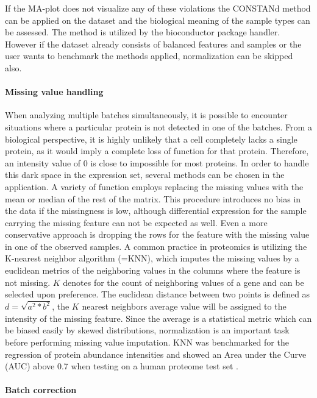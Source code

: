 \documentclass[
  11pt,
]{article}
\begin{document}
If the MA-plot does not visualize any of these violations the CONSTANd
method can be applied on the dataset and the biological meaning of the
sample types can be assessed. The method is utilized by the bioconductor
package handler. However if the dataset already consists of balanced
features and samples or the user wants to benchmark the methods applied,
normalization can be skipped also.

\hypertarget{missing-value-handling}{%
\paragraph{Missing value handling}\label{missing-value-handling}}

When analyzing multiple batches simultaneously, it is possible to
encounter situations where a particular protein is not detected in one
of the batches. From a biological perspective, it is highly unlikely
that a cell completely lacks a single protein, as it would imply a
complete loss of function for that protein. Therefore, an intensity
value of 0 is close to impossible for most proteins. In order to handle
this dark space in the expression set, several methods can be chosen in
the application. A variety of function employs replacing the missing
values with the mean or median of the rest of the matrix. This procedure
introduces no bias in the data if the missingness is low, although
differential expression for the sample carrying the missing feature can
not be expected as well. Even a more conservative approach is dropping
the rows for the feature with the missing value in one of the observed
samples. A common practice in proteomics is utilizing the K-nearest
neighbor algorithm (=KNN), which imputes the missing values by a
euclidean metrics of the neighboring values in the columns where the
feature is not missing. \(K\) denotes for the count of neighboring
values of a gene and can be selected upon preference. The euclidean
distance between two points is defined as \(d = \sqrt{a^2 * b^2}\), the
\(K\) nearest neighbors average value will be assigned to the intensity
of the missing feature. Since the average is a statistical metric which
can be biased easily by skewed distributions, normalization is an
important task before performing missing value imputation. KNN was
benchmarked for the regression of protein abundance intensities and
showed an Area under the Curve (AUC) above 0.7 when testing on a human
proteome test set \citep{Lan2013}.

\hypertarget{batch-correction}{%
\paragraph{Batch correction}\label{batch-correction}}
\end{document}
